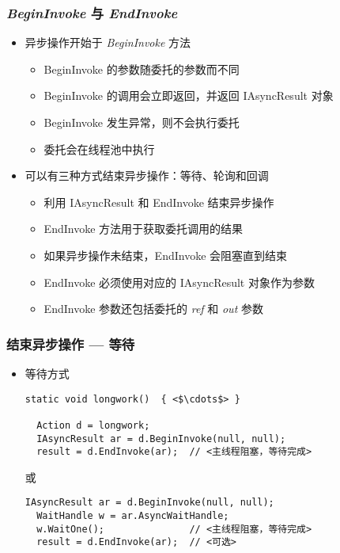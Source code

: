\begin{frame}[fragile]
\frametitle{\emph{BeginInvoke} 与 \emph{EndInvoke}}
\begin{itemize}
\item 异步操作开始于 \textit{BeginInvoke} 方法
\begin{itemize}
\setlength{\itemsep}{4pt plus 1pt}
\item BeginInvoke 的参数随委托的参数而不同
\item BeginInvoke 的调用会立即返回，并返回 IAsyncResult 对象
\item BeginInvoke 发生异常，则不会执行委托
\item 委托会在线程池中执行
\end{itemize}
\item 可以有三种方式结束异步操作：等待、轮询和回调
\begin{itemize}
\setlength{\itemsep}{4pt plus 1pt}
\item 利用 IAsyncResult 和 EndInvoke 结束异步操作
\item EndInvoke 方法用于获取委托调用的结果
\item 如果异步操作未结束，EndInvoke 会阻塞直到结束
\item EndInvoke 必须使用对应的 IAsyncResult 对象作为参数
\item EndInvoke 参数还包括委托的 \textit{ref} 和 \textit{out} 参数
\end{itemize}
\end{itemize}

\end{frame}

\begin{frame}[fragile]
\frametitle{结束异步操作 --- 等待}

\begin{itemize}
\item 等待方式
\begin{lstlisting}[escapeinside=<>]
static void longwork()  { <$\cdots$> }

  Action d = longwork;
  IAsyncResult ar = d.BeginInvoke(null, null);
  result = d.EndInvoke(ar);  // <主线程阻塞，等待完成>
\end{lstlisting}
或
\begin{lstlisting}[escapeinside=<>]
  IAsyncResult ar = d.BeginInvoke(null, null);
  WaitHandle w = ar.AsyncWaitHandle;
  w.WaitOne();               // <主线程阻塞，等待完成>
  result = d.EndInvoke(ar);  // <可选>
\end{lstlisting}
\end{itemize}
\end{frame}

